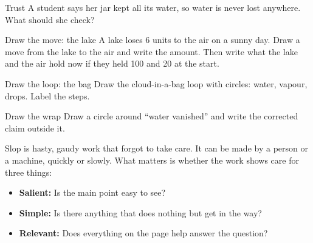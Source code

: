 \begin{puzzle}{Trust}
A student says her jar kept all its water, so water is never lost anywhere. What should she check? \wline[6cm]
\end{puzzle}

\clearpage

\begin{puzzle}{Draw the move: the lake}
A lake loses 6 units to the air on a sunny day. Draw a move from the lake to the air and write the amount. Then write what the lake and the air hold now if they held 100 and 20 at the start.
\begin{center}\end{center}
\end{puzzle}

\begin{puzzle}{Draw the loop: the bag}
Draw the cloud-in-a-bag loop with circles: water, vapour, drops. Label the steps.
\begin{center}\end{center}
\end{puzzle}

\begin{puzzle}{Draw the wrap}
Draw a circle around ``water vanished'' and write the corrected claim outside it.
\begin{center}\end{center}
\end{puzzle}

\clearpage
\thispagestyle{fancy}\label{slop}
Slop is hasty, gaudy work that forgot to take care. It can be made by a person or a machine, quickly or slowly. What matters is whether the work shows care for three things:
\begin{itemize}[leftmargin=1.6em]
\item \textbf{Salient:} Is the main point easy to see?
\item \textbf{Simple:} Is there anything that does nothing but get in the way?
\item \textbf{Relevant:} Does everything on the page help answer the question?
\end{itemize}

